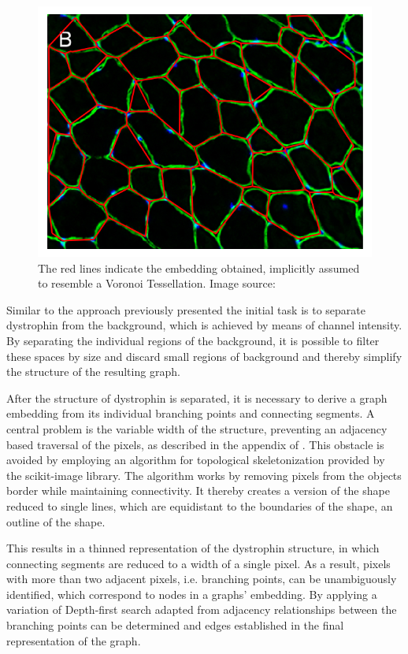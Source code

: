 \documentclass[a4paper]{article}
\begin{document}
\begin{figure}[H]
	\includegraphics[width=\textwidth]{voronoi_tessellation_from_image.png}
	\caption{The red lines indicate the embedding obtained, implicitly assumed to resemble
		a Voronoi Tessellation. Image source: \cite{Park2015}}
\end{figure}

Similar to the approach previously presented the initial task is to separate dystrophin from the background, which
is achieved by means of channel intensity. By separating the individual regions of the background, it is possible
to filter these spaces by size and discard small regions of background and thereby simplify the structure of
the resulting graph.

After the structure of dystrophin is separated, it is necessary to derive a graph embedding from its individual
branching points and connecting segments. A central problem is the variable width of the structure, preventing
an adjacency based traversal of the pixels, as described in the appendix of \cite{Schneider2015}.
This obstacle is avoided by employing an algorithm for topological skeletonization provided by the scikit-image library.
The algorithm works by removing pixels from the objects border while maintaining connectivity. It thereby creates a
version of the shape reduced to single lines, which are equidistant to the boundaries of the shape, an outline
of the shape.

This results in a thinned representation of the dystrophin structure, in which connecting segments are reduced to a width
of a single pixel. As a result, pixels with more than two adjacent pixels, i.e. branching points, can be
unambiguously identified, which correspond to nodes in a graphs' embedding. By applying a variation of Depth-first search
adapted from \cite{Schneider2015} adjacency relationships between the branching points can be determined and edges
established in the final representation of the graph.
\end{document}
